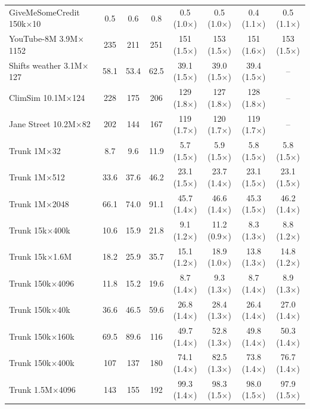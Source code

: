 \begin{table}[p]
\begin{tabular}{l|ccc|cccc}
        GiveMeSomeCredit 150k$\times$10 & 0.5 & 0.6 & 0.8 & 0.5 (1.0$\times$) & 0.5 (1.0$\times$) & 0.4 (1.1$\times$) & 0.5 (1.1$\times$) \\
        YouTube-8M 3.9M$\times$1152 & 235 & 211 & 251 & 151 (1.5$\times$) & 153 (1.5$\times$) & 151 (1.6$\times$) & 153 (1.5$\times$) \\
        Shifts weather 3.1M$\times$127 & 58.1 & 53.4 & 62.5 & 39.1 (1.5$\times$) & 39.0 (1.5$\times$) & 39.4 (1.5$\times$) & -- \\
        ClimSim 10.1M$\times$124 & 228 & 175 & 206 & 129 (1.8$\times$) & 127 (1.8$\times$) & 128 (1.8$\times$) & -- \\
        Jane Street 10.2M$\times$82 & 202 & 144 & 167 & 119 (1.7$\times$) & 120 (1.7$\times$) & 119 (1.7$\times$) & -- \\
        Trunk 1M$\times$32 & 8.7 & 9.6 & 11.9 & 5.7 (1.5$\times$) & 5.9 (1.5$\times$) & 5.8 (1.5$\times$) & 5.8 (1.5$\times$) \\
        Trunk 1M$\times$512 & 33.6 & 37.6 & 46.2 & 23.1 (1.5$\times$) & 23.7 (1.4$\times$) & 23.1 (1.5$\times$) & 23.1 (1.5$\times$) \\
        Trunk 1M$\times$2048 & 66.1 & 74.0 & 91.1 & 45.7 (1.4$\times$) & 46.6 (1.4$\times$) & 45.3 (1.5$\times$) & 46.2 (1.4$\times$) \\
        Trunk 15k$\times$400k & 10.6 & 15.9 & 21.8 & 9.1 (1.2$\times$) & 11.2 (0.9$\times$) & 8.3 (1.3$\times$) & 8.8 (1.2$\times$) \\
        Trunk 15k$\times$1.6M & 18.2 & 25.9 & 35.7 & 15.1 (1.2$\times$) & 18.9 (1.0$\times$) & 13.8 (1.3$\times$) & 14.8 (1.2$\times$) \\
        Trunk 150k$\times$4096 & 11.8 & 15.2 & 19.6 & 8.7 (1.4$\times$) & 9.3 (1.3$\times$) & 8.7 (1.4$\times$) & 8.9 (1.3$\times$) \\
        Trunk 150k$\times$40k & 36.6 & 46.5 & 59.6 & 26.8 (1.4$\times$) & 28.4 (1.3$\times$) & 26.4 (1.4$\times$) & 27.0 (1.4$\times$) \\
        Trunk 150k$\times$160k & 69.5 & 89.6 & 116 & 49.7 (1.4$\times$) & 52.8 (1.3$\times$) & 49.8 (1.4$\times$) & 50.3 (1.4$\times$) \\
        Trunk 150k$\times$400k & 107 & 137 & 180 & 74.1 (1.4$\times$) & 82.5 (1.3$\times$) & 73.8 (1.4$\times$) & 76.7 (1.4$\times$) \\
        Trunk 1.5M$\times$4096 & 143 & 155 & 192 & 99.3 (1.4$\times$) & 98.3 (1.5$\times$) & 98.0 (1.5$\times$) & 97.9 (1.5$\times$) \\

\end{tabular}
\end{table}
